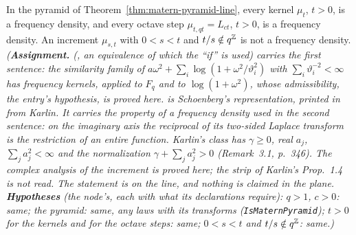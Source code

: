 \begin{theorem}
\label{thm:matern-pyramid-line-noncreation}
\leanok
{}
In the \Matern{} pyramid of Theorem~\ref{thm:matern-pyramid-line}, every kernel $\mu_t$, $t > 0$, is
a \Polya{} frequency density, and every octave step $\mu_{t,qt} = L_{ct}$, $t > 0$, is a \Polya{}
frequency density.
An increment $\mu_{s,t}$ with $0 < s < t$ and $t/s \notin q^{\mathbb{Z}}$ is not a \Polya{}
frequency density.
\statusA\quad{}\quad{}\quad\emph{(\textbf{Assignment.} 
(, an equivalence of which the ``if'' is used) carries
the first sentence: the similarity family of $a\omega^2 + \sum_i\log(1 + \omega^2/\vartheta_i^2)$
with $\sum_i\vartheta_i^{-2} < \infty$ has \Polya{} frequency kernels, applied to $F_q$ and to
$\log(1 + \omega^2)$, whose admissibility, the entry's hypothesis, is proved here.
 is Schoenberg's representation, printed in
 from Karlin. It carries the property of a \Polya{}
frequency density used in the second sentence: on the imaginary axis the reciprocal of its
two-sided Laplace transform is the restriction of an entire function. Karlin's class has
$\gamma \ge 0$, real $a_j$, $\sum_ja_j^2 < \infty$ and the normalization
$\gamma + \sum_ja_j^2 > 0$ (Remark~3.1, p.~346). The complex analysis of the increment is proved
here; the strip of Karlin's Prop.~1.4 is not read. The statement is on the line, and nothing is
claimed in the plane. \textbf{Hypotheses} (the node's, each with what its declarations require):
$q > 1$, $c > 0$: same; the \Matern{} pyramid: same, any laws with its transforms
(\texttt{IsMaternPyramid}); $t > 0$ for the kernels and for the octave steps: same; $0 < s < t$ and
$t/s \notin q^{\mathbb{Z}}$: same.)}
\end{theorem}

